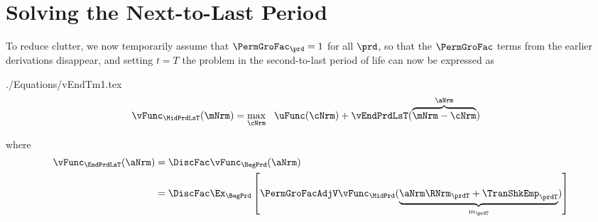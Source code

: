 \documentclass[\econtexRoot/SolvingMicroDSOPs]{subfiles}
\begin{document}
\hypertarget{solving-the-next-to-last-period}{}
\hypertarget{solving-the-next}{}
\section{Solving the Next-to-Last Period}\label{sec:solving-the-next}

To reduce clutter, we now temporarily assume that $\PermGroFac_{\prd}=1$ for all $\prd$, so that the $\PermGroFac$ terms from the earlier derivations disappear, and setting $t=T$ the problem in the second-to-last period of life can now be expressed as
\begin{verbatimwrite}{./Equations/vEndTm1.tex}
\begin{equation}\begin{gathered}\begin{aligned}
  \vFunc_{\MidPrdLsT}(\mNrm)  & = \max_{\cNrm} ~~ \uFunc(\cNrm) +
                              \vEndPrdLsT(\overbrace{\mNrm-\cNrm}^{\aNrm})
                              \label{eq:vEndTm1}
\end{aligned}\end{gathered}\end{equation}
\end{verbatimwrite}
\unskip
where 
\begin{equation*}\begin{gathered}\begin{aligned}
  \vFunc_{\EndPrdLsT}(\aNrm)  & = \DiscFac \vFunc_{\BegPrd}(\aNrm) 
\\                          & = \DiscFac \Ex_{\BegPrd} \left[\PermGroFacAdjV \vFunc_{\MidPrd}(\underbrace{\aNrm \RNrm_{\prdT} + \TranShkEmp_{\prdT}}_{{m}_{\prdT}})\right]
    \end{aligned}\end{gathered}\end{equation*}

\end{document}
